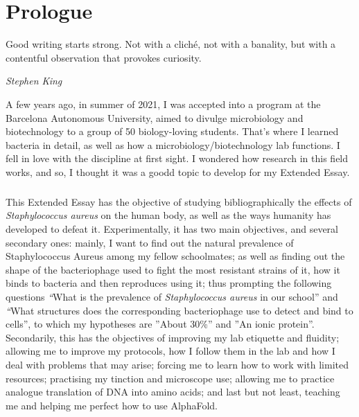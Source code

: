 \chapter{Prologue}
\epigraph{Good writing starts strong. Not with a cliché, not with a banality, but with a contentful observation that provokes curiosity.}{\textit{Stephen King}}
A few years ago, in summer of 2021, I was accepted into a program at the Barcelona Autonomous University, aimed to divulge microbiology and biotechnology to a group of 50 biology-loving students. That's where I learned bacteria in detail, as well as how a microbiology/biotechnology lab functions. I fell in love with the discipline at first sight. I wondered how research in this field works, and so, I thought it was a goodd topic to develop for my Extended Essay.

\paragraph{}This Extended Essay has the objective of studying bibliographically the effects of \emph{Staphylococcus aureus} on the human body, as well as the ways humanity has developed to defeat it. Experimentally, it has two main objectives, and several secondary ones: mainly, I want to find out the natural prevalence of Staphylococcus Aureus among my fellow schoolmates; as well as finding out the shape of the bacteriophage used to fight the most resistant strains of it, how it binds to bacteria and then reproduces using it; thus prompting the following questions \emph“What is the prevalence of \emph{Staphylococcus aureus} in our school” and \emph“What structures does the corresponding bacteriophage use to detect and bind to cells”, to which my hypotheses are ”About 30\%” and ”An ionic protein”. Secondarily, this has the objectives of improving my lab etiquette and fluidity; allowing me to improve my protocols, how I follow them in the lab and how I deal with problems that may arise; forcing me to learn how to work with limited resources; practising my tinction and microscope use; allowing me to practice analogue translation of DNA into amino acids; and last but not least, teaching me and helping me perfect how to use AlphaFold.

